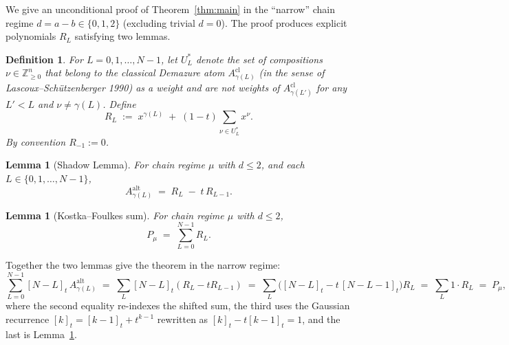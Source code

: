 \documentclass[11pt]{article}
\newtheorem{lemma}[theorem]{Lemma}
\newtheorem{definition}[theorem]{Definition}
\newcommand{\Aalt}{A^{\mathrm{alt}}}
\newcommand{\gauss}[1]{[#1]_t}
\begin{document}
We give an unconditional proof of Theorem~\ref{thm:main} in the ``narrow''
chain regime $d = a - b \in \{0, 1, 2\}$ (excluding trivial $d = 0$).  The
proof produces explicit polynomials $R_L$ satisfying two lemmas.

\begin{definition}\label{def:RL}
For $L = 0, 1, \ldots, N-1$, let $U_L^*$ denote the set of compositions
$\nu \in \mathbb Z_{\ge 0}^n$ that belong to the classical Demazure atom
$A_{\gamma(L)}^{\mathrm{cl}}$ (in the sense of Lascoux--Sch\"utzenberger 1990)
as a weight and are not weights of $A_{\gamma(L')}^{\mathrm{cl}}$ for any
$L' < L$ and $\nu \ne \gamma(L)$.  Define
\[
  R_L \;:=\; x^{\gamma(L)} \;+\; (1-t) \sum_{\nu \in U_L^*} x^\nu.
\]
By convention $R_{-1} := 0$.
\end{definition}

\begin{lemma}[Shadow Lemma]\label{lem:shadowRL}
For chain regime $\mu$ with $d \le 2$, and each $L \in \{0, 1, \ldots, N-1\}$,
\[
  \Aalt_{\gamma(L)} \;=\; R_L \;-\; t\, R_{L-1}.
\]
\end{lemma}

\begin{lemma}[Kostka--Foulkes sum]\label{lem:KFsum}
For chain regime $\mu$ with $d \le 2$,
\[
  P_\mu \;=\; \sum_{L=0}^{N-1} R_L.
\]
\end{lemma}

Together the two lemmas give the theorem in the narrow regime:
\[
  \sum_{L=0}^{N-1} \gauss{N-L}\, \Aalt_{\gamma(L)}
  \;=\; \sum_L \gauss{N-L} (R_L - t R_{L-1})
  \;=\; \sum_L \bigl(\gauss{N-L} - t\, \gauss{N-L-1}\bigr) R_L
  \;=\; \sum_L 1 \cdot R_L
  \;=\; P_\mu,
\]
where the second equality re-indexes the shifted sum, the third uses the
Gaussian recurrence $\gauss{k} = \gauss{k-1} + t^{k-1}$ rewritten as
$\gauss{k} - t \gauss{k-1} = 1$, and the last is Lemma~\ref{lem:KFsum}.
\end{document}
